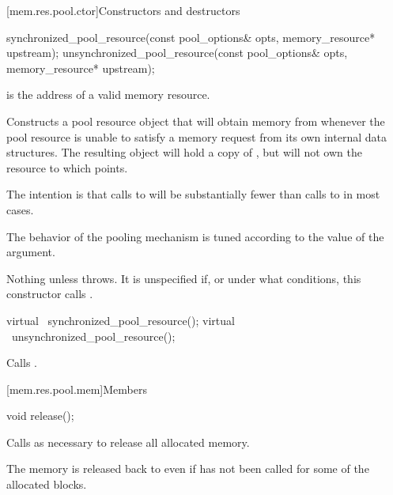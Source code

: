 [mem.res.pool.ctor]{Constructors and destructors}

%
%
\begin{itemdecl}
synchronized_pool_resource(const pool_options& opts, memory_resource* upstream);
unsynchronized_pool_resource(const pool_options& opts, memory_resource* upstream);
\end{itemdecl}

\begin{itemdescr}
\pnum
\expects
{} is the address of a valid memory resource.

\pnum
\effects
Constructs a pool resource object that will obtain memory from 
whenever the pool resource is unable to satisfy a memory request
from its own internal data structures.
The resulting object will hold a copy of ,
but will not own the resource to which  points.
\begin{note}
The intention is that calls to 
will be substantially fewer than calls to 
in most cases.
\end{note}
The behavior of the pooling mechanism is tuned
according to the value of the  argument.

\pnum
\throws
Nothing unless  throws.
It is unspecified if, or under what conditions,
this constructor calls .
\end{itemdescr}

%
%
\begin{itemdecl}
virtual ~synchronized_pool_resource();
virtual ~unsynchronized_pool_resource();
\end{itemdecl}

\begin{itemdescr}
\pnum
\effects
Calls .
\end{itemdescr}

[mem.res.pool.mem]{Members}

%
%
\begin{itemdecl}
void release();
\end{itemdecl}

\begin{itemdescr}
\pnum
\effects
Calls  as necessary
to release all allocated memory.
\begin{note}
The memory is released back to 
even if  has not been called
for some of the allocated blocks.
\end{note}
\end{itemdescr}

